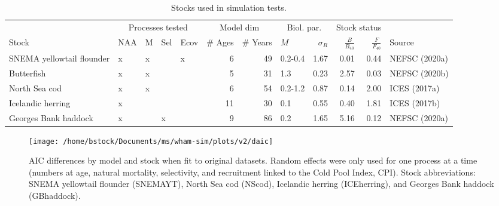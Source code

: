 \documentclass[]{article}
\begin{document}
\begin{landscape}
\begin{table}

\caption{\label{tab:stock-list}Stocks used in simulation tests.}
\centering
\begin{tabular}[t]{lllllrrlrrrl}
\toprule
\multicolumn{1}{c}{ } & \multicolumn{4}{c}{Processes tested} & \multicolumn{2}{c}{Model dim} & \multicolumn{2}{c}{Biol. par.} & \multicolumn{2}{c}{Stock status} \\
\cmidrule(l{3pt}r{3pt}){2-5} \cmidrule(l{3pt}r{3pt}){6-7} \cmidrule(l{3pt}r{3pt}){8-9} \cmidrule(l{3pt}r{3pt}){10-11}
Stock & NAA & M & Sel & Ecov & \# Ages & \# Years & $M$ & $\sigma_R$ & $\frac{B}{B_{40}}$ & $\frac{F}{F_{40}}$ & Source\\
\midrule
SNEMA yellowtail flounder & x & x &  & x & 6 & 49 & 0.2-0.4 & 1.67 & 0.01 & 0.44 & NEFSC (2020a)\\
Butterfish & x & x &  &  & 5 & 31 & 1.3 & 0.23 & 2.57 & 0.03 & NEFSC (2020b)\\
North Sea cod & x & x &  &  & 6 & 54 & 0.2-1.2 & 0.87 & 0.14 & 2.00 & ICES (2017a)\\
Icelandic herring & x &  &  &  & 11 & 30 & 0.1 & 0.55 & 0.40 & 1.81 & ICES (2017b)\\
Georges Bank haddock & x &  & x &  & 9 & 86 & 0.2 & 1.65 & 5.16 & 0.12 & NEFSC (2020a)\\
\bottomrule
\end{tabular}
\end{table}
\end{landscape}

\pagebreak

\begin{landscape}
\begin{figure}

{\centering \texttt{[image: /home/bstock/Documents/ms/wham-sim/plots/v2/daic]} 

}

\caption{AIC differences by model and stock when fit to original datasets. Random effects were only used for one process at a time (numbers at age, natural mortality, selectivity, and recruitment linked to the Cold Pool Index, CPI). Stock abbreviations: SNEMA yellowtail flounder (SNEMAYT), North Sea cod (NScod), Icelandic herring (ICEherring), and Georges Bank haddock (GBhaddock).}\label{fig:daic}
\end{figure}
\end{landscape}

\pagebreak
\end{document}
